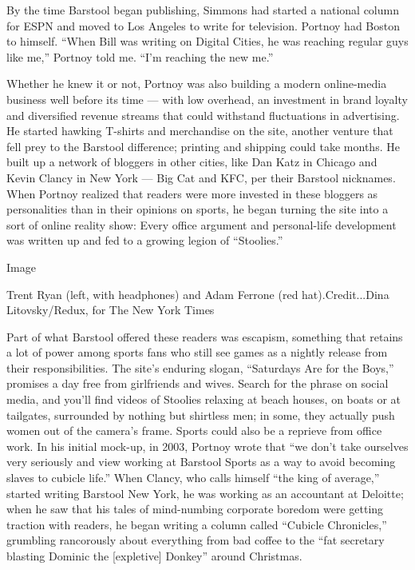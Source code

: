 By the time Barstool began publishing, Simmons had started a national
column for ESPN and moved to Los Angeles to write for television.
Portnoy had Boston to himself. ``When Bill was writing on Digital
Cities, he was reaching regular guys like me,'' Portnoy told me. ``I'm
reaching the new me.''

Whether he knew it or not, Portnoy was also building a modern
online-media business well before its time --- with low overhead, an
investment in brand loyalty and diversified revenue streams that could
withstand fluctuations in advertising. He started hawking T-shirts and
merchandise on the site, another venture that fell prey to the Barstool
difference; printing and shipping could take months. He built up a
network of bloggers in other cities, like Dan Katz in Chicago and Kevin
Clancy in New York --- Big Cat and KFC, per their Barstool nicknames.
When Portnoy realized that readers were more invested in these bloggers
as personalities than in their opinions on sports, he began turning the
site into a sort of online reality show: Every office argument and
personal-life development was written up and fed to a growing legion of
``Stoolies.''

Image

Trent Ryan (left, with headphones) and Adam Ferrone (red
hat).Credit...Dina Litovsky/Redux, for The New York Times

Part of what Barstool offered these readers was escapism, something that
retains a lot of power among sports fans who still see games as a
nightly release from their responsibilities. The site's enduring slogan,
``Saturdays Are for the Boys,'' promises a day free from girlfriends and
wives. Search for the phrase on social media, and you'll find videos of
Stoolies relaxing at beach houses, on boats or at tailgates, surrounded
by nothing but shirtless men; in some, they actually push women out of
the camera's frame. Sports could also be a reprieve from office work. In
his initial mock-up, in 2003, Portnoy wrote that ``we don't take
ourselves very seriously and view working at Barstool Sports as a way to
avoid becoming slaves to cubicle life.'' When Clancy, who calls himself
``the king of average,'' started writing Barstool New York, he was
working as an accountant at Deloitte; when he saw that his tales of
mind-numbing corporate boredom were getting traction with readers, he
began writing a column called ``Cubicle Chronicles,'' grumbling
rancorously about everything from bad coffee to the ``fat secretary
blasting Dominic the {[}expletive{]} Donkey'' around Christmas.

